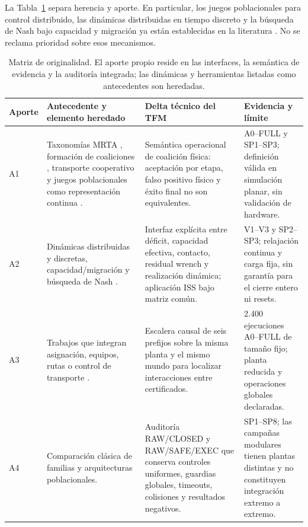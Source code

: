 La Tabla~\ref{tab:matriz-originalidad} separa herencia y aporte. En particular, los juegos poblacionales para control distribuido, las dinámicas distribuidas en tiempo discreto y la búsqueda de Nash bajo capacidad y migración ya están establecidas en la literatura \citep{quijano2017population,barreiro2017distributed,martinez2020formation,martinezpiazuelo2022tcss,martinezpiazuelo2022automatica}. No se reclama prioridad sobre esos mecanismos.

\begin{table}[H]
\centering
\scriptsize
\begin{tabularx}{\textwidth}{@{}p{}p{}p{}X@{}}
\toprule
Aporte & Antecedente y elemento heredado & Delta técnico del TFM & Evidencia y límite \\
\midrule
A1 & Taxonomías MRTA \citep{gerkey2004formal,korsah2013taxonomy}, formación de coaliciones \citep{dutta2021hedonic,zhang2024coalition}, transporte cooperativo \citep{tuci2018cooperative} y juegos poblacionales como representación continua \citep{quijano2017population}. & Semántica operacional de coalición física: aceptación por etapa, falso positivo físico y éxito final no son equivalentes. & A0--FULL y SP1--SP3; definición válida en simulación planar, sin validación de hardware. \\
A2 & Dinámicas distribuidas y discretas, capacidad/migración y búsqueda de Nash \citep{barreiro2017distributed,martinez2020formation,martinezpiazuelo2022tcss,martinezpiazuelo2022automatica}. & Interfaz explícita entre déficit, capacidad efectiva, contacto, residual wrench y realización dinámica; aplicación ISS bajo matriz común. & V1--V3 y SP2--SP3; relajación continua y carga fija, sin garantía para el cierre entero ni resets. \\
A3 & Trabajos que integran asignación, equipos, rutas o control de transporte \citep{paul2023collective,brown2025assembly,zhou2026cttapf}. & Escalera causal de seis prefijos sobre la misma planta y el mismo mundo para localizar interacciones entre certificados. & 2.400 ejecuciones A0--FULL de tamaño fijo; planta reducida y operaciones globales declaradas. \\
A4 & Comparación clásica de familias y arquitecturas poblacionales. & Auditoría RAW/CLOSED y RAW/SAFE/EXEC que conserva controles uniformes, guardias globales, timeouts, colisiones y resultados negativos. & SP1--SP8; las campañas modulares tienen plantas distintas y no constituyen integración extremo a extremo. \\
\bottomrule
\end{tabularx}
\caption{Matriz de originalidad. El aporte propio reside en las interfaces, la semántica de evidencia y la auditoría integrada; las dinámicas y herramientas listadas como antecedentes son heredadas.}
\label{tab:matriz-originalidad}
\end{table}


